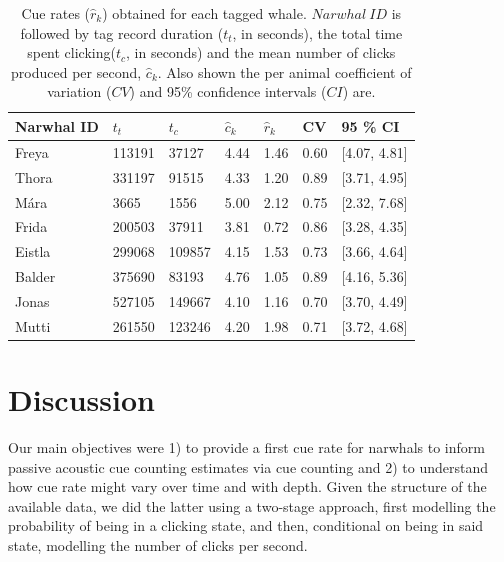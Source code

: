 \documentclass[preprint]{JASA}
\begin{document}
\begin{table}[ht]
\caption{\label{tab:TAB3}{Cue rates ($\hat r_k$) obtained for each tagged whale. $Narwhal~ID$ is followed by tag record duration ($t_t$, in seconds), the total time spent clicking($t_c$, in seconds) and the mean number of clicks produced per second, $\hat c_k$. Also shown the per animal coefficient of variation ($CV$) and 95\% confidence intervals ($CI$) are.}}
\vskip3pt
\begin{tabular}{p{3cm}p{2cm}p{2cm}p{2cm}p{2cm}p{2cm}p{2cm}}

\hline\hline
 Narwhal ID & $t_t$ & $t_c$ & $\hat c_k$ & $\hat r_k$ & CV & 95 \% CI\\
\hline
Freya & 113191 & 37127 & 4.44 & 1.46 & 0.60 & [4.07, 4.81]\\
Thora & 331197 & 91515 & 4.33 & 1.20 & 0.89 & [3.71, 4.95] \\
Mára & 3665 & 1556 & 5.00 & 2.12 & 0.75 & [2.32, 7.68]\\
Frida & 200503 & 37911 & 3.81 & 0.72 & 0.86 & [3.28, 4.35]\\
Eistla & 299068 & 109857 & 4.15 & 1.53  & 0.73 & [3.66, 4.64]\\
Balder & 375690 & 83193 & 4.76 & 1.05  & 0.89 & [4.16, 5.36]\\
Jonas & 527105 & 149667 & 4.10 & 1.16  & 0.70 & [3.70, 4.49] \\
Mutti & 261550 & 123246 & 4.20 & 1.98  & 0.71 & [3.72, 4.68]\\
\hline\hline
\end{tabular}
\end{table}



\section{\label{sec:4} Discussion}

Our main objectives were 1) to provide a first cue rate for narwhals to inform passive acoustic cue counting estimates via cue counting and 2) to understand how cue rate might vary over time and with depth. Given the structure of the available data, we did the latter using a two-stage approach, first modelling the probability of being in a clicking state, and then, conditional on being in said state, modelling the number of clicks per second. 
\end{document}
